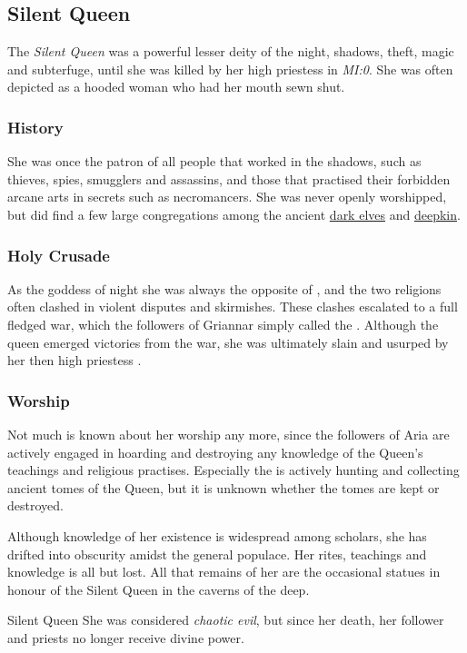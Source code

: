 \subsection{Silent Queen}
\label{sec:Silent Queen}

The \emph{Silent Queen} was a powerful lesser deity of the night, shadows,
theft, magic and subterfuge, until she was killed by her high priestess
 in \emph{MI:0}. She was often depicted as a hooded woman who
had her mouth sewn shut.

\subsubsection{History}

She was once the patron of all people that worked in the shadows, such as
thieves, spies, smugglers and assassins, and those that practised their
forbidden arcane arts in secrets such as necromancers. She was never openly
worshipped, but did find a few large congregations among the ancient
\hyperref[sec:Dark Elves]{dark elves} and \hyperref[sec:Deepkin]{deepkin}.

\subsubsection{Holy Crusade}

As the goddess of night she was always the opposite of ,
and the two religions often clashed in violent disputes and skirmishes. These
clashes escalated to a full fledged war, which the followers of Griannar simply
called the . Although the queen emerged victories
from the war, she was ultimately slain and usurped by her then high priestess
.

\subsubsection{Worship}

Not much is known about her worship any more, since the followers of Aria are
actively engaged in hoarding and destroying any knowledge of the Queen's
teachings and religious practises. Especially the 
is actively hunting and collecting ancient tomes of the Queen, but it is
unknown whether the tomes are kept or destroyed.

Although knowledge of her existence is widespread among scholars, she has
drifted into obscurity amidst the general populace. Her rites, teachings
and knowledge is all but lost. All that remains of her are the occasional
statues in honour of the Silent Queen in the caverns of the deep.

\begin{35e}{Silent Queen}
  She was considered \emph{chaotic evil}, but since her death, her follower
  and priests no longer receive divine power.
\end{35e}
